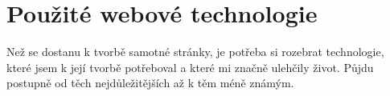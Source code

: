 \fancyhf{}
\rfoot{\helv \thepage}

\chapter{Použité webové technologie}
Než se dostanu k tvorbě samotné stránky, je potřeba si rozebrat technologie, které jsem k její tvorbě potřeboval a které mi značně ulehčily život. Půjdu postupně od těch nejdůležitějších až k těm méně známým.


\newpage

\newpage

\newpage

\newpage

\newpage

\newpage

\newpage

\newpage

\newpage

\newpage

\newpage

\newpage

\newpage

\newpage
